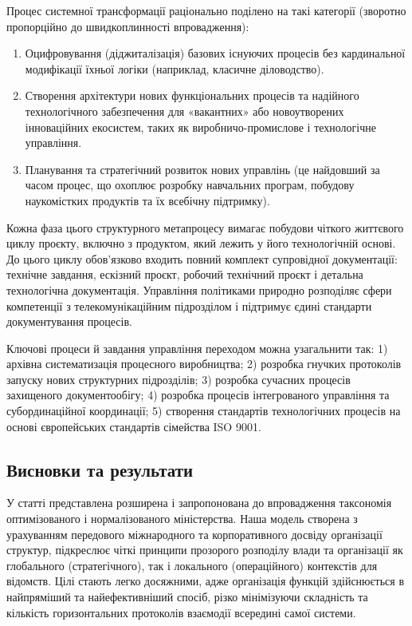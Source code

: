Процес системної трансформації раціонально поділено на такі категорії (зворотно пропорційно до швидкоплинності впровадження):
\begin{enumerate}
    \item Оцифровування (діджиталізація) базових існуючих процесів без кардинальної модифікації їхньої логіки (наприклад, класичне діловодство).
    \item Створення архітектури нових функціональних процесів та надійного технологічного забезпечення для «вакантних» або новоутворених інноваційних екосистем, таких як виробничо-промислове і технологічне управління.
    \item Планування та стратегічний розвиток нових управлінь (це найдовший за часом процес, що охоплює розробку навчальних програм, побудову наукомістких продуктів та їх всебічну підтримку).
\end{enumerate}

Кожна фаза цього структурного метапроцесу вимагає побудови чіткого життєвого циклу проєкту, включно з продуктом, який лежить у його технологічній основі. До цього циклу обов'язково входить повний комплект супровідної документації: технічне завдання, ескізний проєкт, робочий технічний проєкт і детальна технологічна документація. Управління політиками природно розподіляє сфери компетенції з телекомунікаційним підрозділом і підтримує єдині стандарти документування процесів.

Ключові процеси й завдання управління переходом можна узагальнити так: 1) архівна систематизація процесного виробництва; 2) розробка гнучких протоколів запуску нових структурних підрозділів; 3) розробка сучасних процесів захищеного документообігу; 4) розробка процесів інтегрованого управління та субординаційної координації; 5) створення стандартів технологічних процесів на основі європейських стандартів сімейства ISO 9001.

\subsection*{Висновки та результати}

У статті представлена розширена і запропонована до впровадження таксономія оптимізованого і нормалізованого міністерства. Наша модель створена з урахуванням передового міжнародного та корпоративного досвіду організації структур, підкреслює чіткі принципи прозорого розподілу влади та організації як глобального (стратегічного), так і локального (операційного) контекстів для відомств. Цілі стають легко досяжними, адже організація функцій здійснюється в найпряміший та найефективніший спосіб, різко мінімізуючи складність та кількість горизонтальних протоколів взаємодії всередині самої системи.

